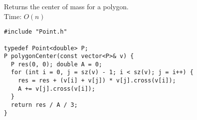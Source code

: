 Returns the center of mass for a polygon.\\
Time: $O(n)$
\begin{verbatim}
#include "Point.h"

typedef Point<double> P;
P polygonCenter(const vector<P>& v) {
  P res(0, 0); double A = 0;
  for (int i = 0, j = sz(v) - 1; i < sz(v); j = i++) {
    res = res + (v[i] + v[j]) * v[j].cross(v[i]);
    A += v[j].cross(v[i]);
  }
  return res / A / 3;
}
\end{verbatim}